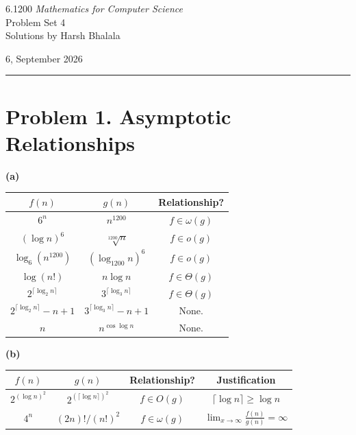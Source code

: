 \documentclass{article}
\begin{document}
\noindent
\begin{minipage}[t]{0.68\textwidth}
{\large 6.1200 \textit{Mathematics for Computer Science}}\\[4pt]
{\large Problem Set 4}\\[4pt]
{\large Solutions by Harsh Bhalala}
\end{minipage}%
\hfill
\begin{minipage}[t]{0.27\textwidth}
\raggedleft
{\large 6, September 2026}
\end{minipage}

\vspace{6pt}

\noindent\rule{\textwidth}{0.5pt}

\section*{Problem 1. Asymptotic Relationships}

\textbf{(a)}
\begin{center}
\begin{tabular}{|c|c|c|}
\hline
$f(n)$ & $g(n)$ & Relationship? \\
\hline \hline
$6^n$ & $n^{1200}$ & $f \in \omega (g)$\\
\hline
$(\log n)^6$ & $\sqrt[1200]{n}$ & $f \in o(g)$\\
\hline
$\log_6 (n^{1200})$ & $(\log_{1200} n)^6$ & $f \in o(g)$ \\
\hline
$\log (n!)$ & $n \log n$ & $f \in \Theta(g)$ \\
\hline
$2^{\lceil \log_2 n \rceil}$ & $3^{\lceil \log_3 n \rceil}$ & $f \in \Theta(g)$ \\
\hline
$2^{\lceil \log_2 n \rceil} - n + 1$ & $3^{\lceil \log_3 n \rceil} - n + 1$ & None.\\
\hline
$n$ & $n^{\cos \log n}$ & None. \\
\hline
\end{tabular}
\end{center}


\vspace{\baselineskip}
\noindent\textbf{(b)}
\begin{center}
\begin{tabular}{|c|c|c|c|}
\hline
$f(n)$ & $g(n)$ & Relationship? & Justification\\
\hline \hline
$2^{(\log n)^2}$ & $2^{(\lceil \log n \rceil)^2}$ & $f \in O(g)$ & $\lceil \log n \rceil \ge \log n$ \\
\hline
$4^n$ & $(2n)!/(n!)^2$ & $f \in \omega (g)$ & $\lim_{x \rightarrow \infty} \frac{f(n)}{g(n)} = \infty$\\
\hline
\end{tabular}
\end{center}
\end{document}
